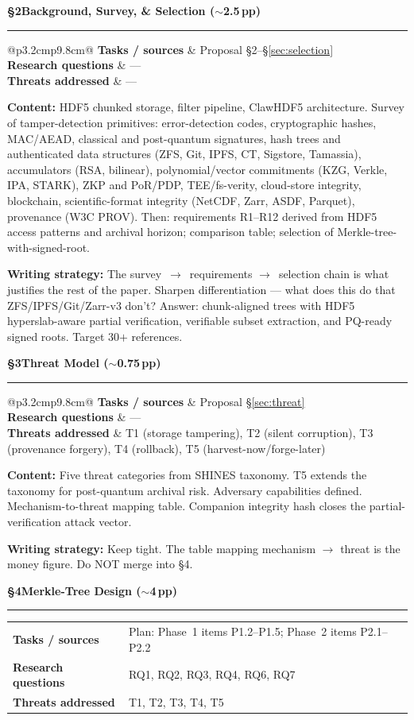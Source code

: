 \documentclass[11pt]{article}
\makeatletter
\newcommand{\mapsec}[3]{%
  \smallskip\noindent
  \begin{tabular}{@{}p{3.2cm}p{9.8cm}@{}}
  \toprule
  \textbf{Tasks / sources}    & #1 \\
  \textbf{Research questions} & #2 \\
  \textbf{Threats addressed}  & #3 \\
  \bottomrule
  \end{tabular}\smallskip}
\makeatother
\begin{document}
\bigskip
\noindent\textcolor{blue!60!black}{\textbf{\S2\quad Background, Survey, \& Selection \hfill($\sim$2.5\,pp)}}
\par\noindent\rule{\linewidth}{0.4pt}
\mapsec{Proposal \S2--\S\ref{sec:selection}}{---}{---}

\noindent\textbf{Content:} HDF5 chunked storage, filter pipeline, ClawHDF5
architecture. Survey of tamper-detection primitives: error-detection codes,
cryptographic hashes, MAC/AEAD, classical and post-quantum signatures, hash
trees and authenticated data structures (ZFS, Git, IPFS, CT, Sigstore, Tamassia),
accumulators (RSA, bilinear), polynomial/vector commitments (KZG, Verkle, IPA,
STARK), ZKP and PoR/PDP, TEE/fs-verity, cloud-store integrity, blockchain,
scientific-format integrity (NetCDF, Zarr, ASDF, Parquet), provenance (W3C PROV).
Then: requirements R1--R12 derived from HDF5 access patterns and archival
horizon; comparison table; selection of Merkle-tree-with-signed-root.

\noindent\textbf{Writing strategy:} The survey~$\rightarrow$~requirements
$\rightarrow$~selection chain is what justifies the rest of the paper. Sharpen
differentiation --- what does this do that ZFS/IPFS/Git/Zarr-v3 don't? Answer:
chunk-aligned trees with HDF5 hyperslab-aware partial verification, verifiable
subset extraction, and PQ-ready signed roots. Target 30$+$ references.

\bigskip
\noindent\textcolor{blue!60!black}{\textbf{\S3\quad Threat Model \hfill($\sim$0.75\,pp)}}
\par\noindent\rule{\linewidth}{0.4pt}
\mapsec{Proposal \S\ref{sec:threat}}{---}{T1 (storage tampering), T2 (silent corruption),
  T3 (provenance forgery), T4 (rollback), T5 (harvest-now/forge-later)}

\noindent\textbf{Content:} Five threat categories from SHINES taxonomy. T5 extends the
taxonomy for post-quantum archival risk. Adversary capabilities defined. Mechanism-to-threat
mapping table. Companion integrity hash closes the partial-verification attack vector.

\noindent\textbf{Writing strategy:} Keep tight. The table mapping mechanism $\rightarrow$
threat is the money figure. Do NOT merge into \S4.

\bigskip
\noindent\textcolor{blue!60!black}{\textbf{\S4\quad Merkle-Tree Design \hfill($\sim$4\,pp)}}
\par\noindent\rule{\linewidth}{0.4pt}
\mapsec{Plan: Phase~1 items P1.2--P1.5; Phase~2 items P2.1--P2.2}{RQ1, RQ2, RQ3,
  RQ4, RQ6, RQ7}{T1, T2, T3, T4, T5}
\end{document}
